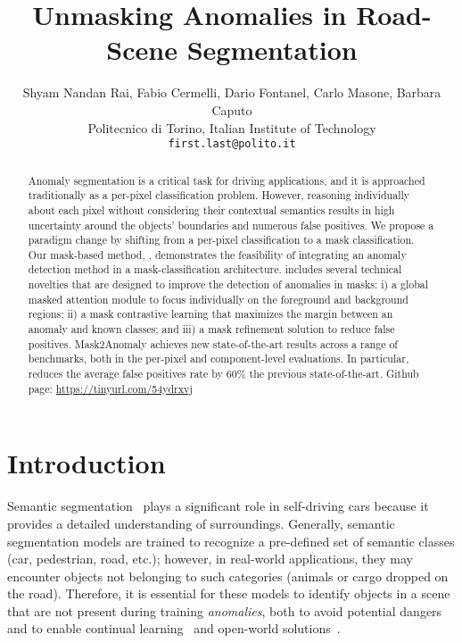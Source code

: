 \documentclass[10pt,twocolumn,letterpaper]{article}
\newcommand\our{\text{Mask2Anomaly}}
\begin{document}
\title{Unmasking Anomalies in Road-Scene Segmentation}


\author{Shyam Nandan Rai, Fabio Cermelli, Dario Fontanel, Carlo Masone, Barbara Caputo\\
Politecnico di Torino, Italian Institute of Technology\\
{\tt\small {first.last}@polito.it}
}
\maketitle
\ificcvfinal\thispagestyle{empty}\fi

\begin{abstract}
Anomaly segmentation is a critical task for driving applications, and it is approached traditionally as a per-pixel classification problem. However, reasoning individually about each pixel without considering their contextual semantics results in high uncertainty around the objects' boundaries and numerous false positives. We propose a paradigm change by shifting from a per-pixel classification to a mask classification. Our mask-based method, {\our}, demonstrates the feasibility of integrating an anomaly detection method in a mask-classification architecture. {\our} includes several technical novelties that are designed to improve the detection of anomalies in masks: i) a global masked attention module to focus individually on the foreground and background regions; ii) a mask contrastive learning that maximizes the margin between an anomaly and known classes; and iii) a mask refinement solution to reduce false positives. Mask2Anomaly achieves new state-of-the-art results across a range of benchmarks, both in the per-pixel and component-level evaluations. In particular, {\our} reduces the average false positives rate by 60\% \wrt the previous state-of-the-art. Github page: \href{https://github.com/shyam671/Mask2Anomaly-Unmasking-Anomalies-in-Road-Scene-Segmentation}{https://tinyurl.com/54ydrxvj}
\end{abstract}





\section{Introduction}
\label{sec:intro}
Semantic segmentation~\cite{Cordts2016Cityscapes,sun2019naae, Zhang2019fsda,yang2020fda,tavera2022pixda} plays a significant role in self-driving cars because it provides a detailed understanding of surroundings. 
Generally, semantic segmentation models are trained to recognize a pre-defined set of semantic classes (\eg car, pedestrian, road, etc.); however, in real-world applications, they may encounter objects not belonging to such categories (\eg animals or cargo dropped on the road). Therefore, it is essential for these models to identify objects in a scene that are not present during training \ie \textit{anomalies}, both to avoid potential dangers and to enable continual learning~\cite{michieli2021continual, cermelli2020modelingthebackground, douillard2020plop, cermelli2022incremental} and open-world solutions~\cite{cen2021deep}.
\end{document}
